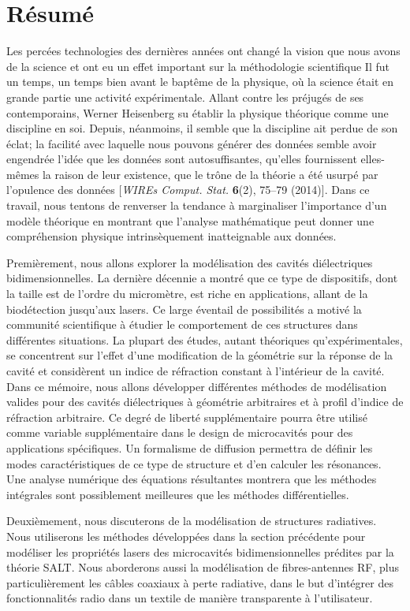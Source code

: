\chapter*{Résumé}
Les percées technologies des dernières années ont changé
la vision que nous avons de la science et ont eu un effet 
important sur la méthodologie scientifique Il fut un temps, un temps
bien avant le baptême de la physique, où la science était
en grande partie une activité expérimentale. Allant 
contre les préjugés de ses contemporains, Werner
Heisenberg su établir la physique théorique comme une
discipline en soi. Depuis, néanmoins, il semble que la
discipline ait perdue de son éclat; la facilité
avec laquelle nous pouvons générer des données semble avoir
engendrée l'idée que les données sont autosuffisantes, 
qu'elles fournissent elles-mêmes la raison de leur existence, 
que le trône de la théorie a été usurpé par l'opulence
des données [\textit{WIREs Comput. Stat.} \textbf{6}(2), 75--79 (2014)]. 
Dans ce travail, nous tentons de renverser
la tendance à marginaliser l'importance d'un modèle 
théorique en montrant que l'analyse mathématique peut donner une 
compréhension physique intrinsèquement inatteignable 
aux données. 

Premièrement, nous allons explorer la modélisation des
cavités diélectriques bidimensionnelles. La dernière
décennie a montré que ce type de dispositifs, dont la 
taille est de l'ordre du micromètre, est riche en applications, 
allant de la biodétection jusqu'aux lasers. Ce large éventail de
possibilités a motivé la communité scientifique à étudier
le comportement de ces structures dans différentes situations.
La plupart des études, autant théoriques qu'expérimentales, 
se concentrent sur l'effet d'une modification de la géométrie 
sur la réponse de la cavité et considèrent un 
indice de réfraction constant à l'intérieur de la cavité. 
Dans ce mémoire, nous allons développer différentes méthodes
de modélisation valides pour des cavités diélectriques à géométrie
arbitraires et à profil d'indice de réfraction arbitraire. Ce
degré de liberté supplémentaire pourra être utilisé comme variable
supplémentaire dans le design de microcavités pour des applications
spécifiques. 
Un formalisme de diffusion permettra de définir les modes caractéristiques
de ce type de structure et d'en calculer les résonances. Une analyse
numérique des équations résultantes montrera que les méthodes intégrales
sont possiblement meilleures que les méthodes différentielles.

Deuxièmement, nous discuterons de la modélisation de structures
radiatives. Nous utiliserons les méthodes développées dans la section
précédente pour modéliser les propriétés lasers des microcavités
bidimensionnelles prédites par la théorie SALT. Nous aborderons
aussi la modélisation de fibres-antennes RF, plus particulièrement
les câbles coaxiaux à perte radiative, dans le but d'intégrer
des fonctionnalités radio dans un textile de manière transparente
à l'utilisateur. 